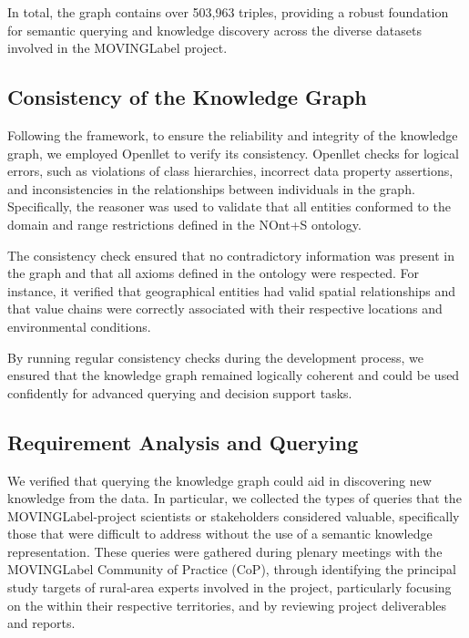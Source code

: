 In total, the graph contains over 503,963 triples, providing a robust foundation for semantic querying and knowledge discovery across the diverse datasets involved in the \acrshort{MOVINGLabel} project. 


\subsection{Consistency of the Knowledge Graph}\label{VII-subsec:moving-consistency}
Following the framework, to ensure the reliability and integrity of the knowledge graph, we employed Openllet\cite{galigatorGaligatorOpenllet2024} to verify its consistency. Openllet checks for logical errors, such as violations of class hierarchies, incorrect data property assertions, and inconsistencies in the relationships between individuals in the graph. Specifically, the reasoner was used to validate that all entities conformed to the domain and range restrictions defined in the NOnt+S ontology.

The consistency check ensured that no contradictory information was present in the graph and that all axioms defined in the ontology were respected. For instance, it verified that geographical entities had valid spatial relationships and that value chains were correctly associated with their respective locations and environmental conditions.

By running regular consistency checks during the development process, we ensured that the knowledge graph remained logically coherent and could be used confidently for advanced querying and decision support tasks.

\subsection{Requirement Analysis and Querying}\label{VII-subsec:moving-querying}
We verified that querying the knowledge graph could aid in discovering new knowledge from the data. In particular, we collected the types of queries that the \acrshort{MOVINGLabel}-project scientists or stakeholders considered valuable, specifically those that were difficult to address without the use of a semantic knowledge representation. These queries were gathered during plenary meetings with the \acrshort{MOVINGLabel} Community of Practice (CoP), through identifying the principal study targets of rural-area experts involved in the project, particularly focusing on the  within their respective territories, and by reviewing project deliverables and reports.

